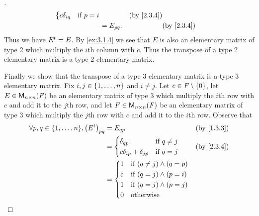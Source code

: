 \begin{proof}[]
\begin{align*}
\begin{dcases}
                                                                c \delta_{i q} & \text{if } p = i
                                                              \end{dcases}    &  & \by{2.3.4}                     \\
                                                          & = E_{p q}.                                 &  & \by{2.3.4}
  \end{align*}
  Thus we have \({E}^{t} = E\).
  By \cref{ex:3.1.4} we see that \(E\) is also an elementary matrix of type 2 which multiply the \(i\)th column with \(c\).
  Thus the transpose of a type 2 elementary matrix is a type 2 elementary matrix.

  Finally we show that the transpose of a type 3 elementary matrix is a type 3 elementary matrix.
  Fix \(i, j \in \left\lbrace1, \dots, n\right\rbrace\) and \(i \neq j\).
  Let \(c \in \mathit{F} \setminus \left\lbrace0\right\rbrace\), let \(E \in \ms[n][n][\F]\) be an elementary matrix of type 3 which multiply the \(i\)th row with \(c\) and add it to the \(j\)th row, and let \(F \in \ms[n][n][\F]\) be an elementary matrix of type 3 which multiply the \(j\)th row with \(c\) and add it to the \(i\)th row.
  Observe that
  \begin{align*}
    \forall p, q \in \set{1, \dots, n}, \pa{\tp{E}}_{p q} & = E_{q p}                                              &  & \by{1.3.3} \\
                                                          & = \begin{dcases}
                                                                \delta_{q p}                  & \text{if } q \neq j \\
                                                                c \delta_{i p} + \delta_{j p} & \text{if } q = j
                                                              \end{dcases} &  & \by{2.3.4}                  \\
                                                          & = \begin{dcases}
                                                                1 & \text{if } (q \neq j) \land (q = p) \\
                                                                c & \text{if } (q = j) \land (p = i)    \\
                                                                1 & \text{if } (q = j) \land (p = j)    \\
                                                                0 & \text{otherwise}

\end{dcases}
\end{align*}
\end{proof}
